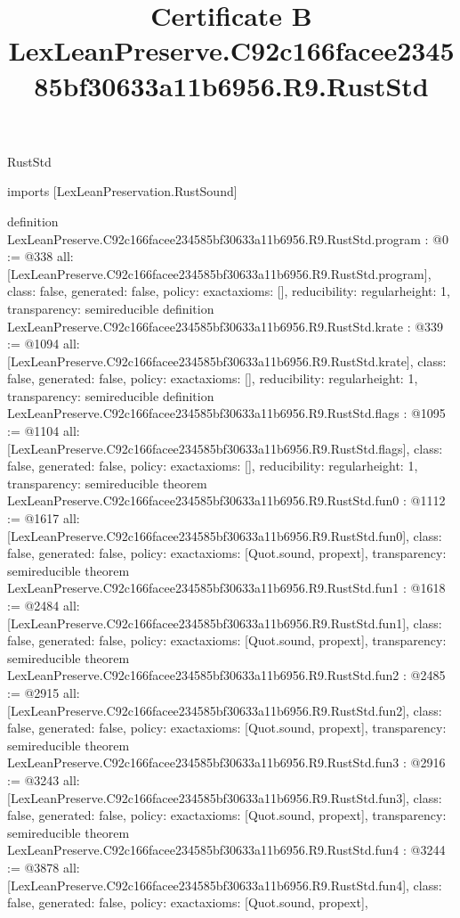 \begin{lexlean}{RustStd}
\title{Certificate B LexLeanPreserve.C92c166facee234585bf30633a11b6956.R9.RustStd}
\begin{coremodule}
imports [LexLeanPreservation.RustSound]

definition LexLeanPreserve.C92c166facee234585bf30633a11b6956.R9.RustStd.program : @0 := @338 {
  all: [LexLeanPreserve.C92c166facee234585bf30633a11b6956.R9.RustStd.program],
  class: false,
  generated: false,
  policy: exact{axioms: []},
  reducibility: regular{height: 1},
  transparency: semireducible
}
definition LexLeanPreserve.C92c166facee234585bf30633a11b6956.R9.RustStd.krate : @339 := @1094 {
  all: [LexLeanPreserve.C92c166facee234585bf30633a11b6956.R9.RustStd.krate],
  class: false,
  generated: false,
  policy: exact{axioms: []},
  reducibility: regular{height: 1},
  transparency: semireducible
}
definition LexLeanPreserve.C92c166facee234585bf30633a11b6956.R9.RustStd.flags : @1095 := @1104 {
  all: [LexLeanPreserve.C92c166facee234585bf30633a11b6956.R9.RustStd.flags],
  class: false,
  generated: false,
  policy: exact{axioms: []},
  reducibility: regular{height: 1},
  transparency: semireducible
}
theorem LexLeanPreserve.C92c166facee234585bf30633a11b6956.R9.RustStd.fun0 : @1112 := @1617 {
  all: [LexLeanPreserve.C92c166facee234585bf30633a11b6956.R9.RustStd.fun0],
  class: false,
  generated: false,
  policy: exact{axioms: [Quot.sound, propext]},
  transparency: semireducible
}
theorem LexLeanPreserve.C92c166facee234585bf30633a11b6956.R9.RustStd.fun1 : @1618 := @2484 {
  all: [LexLeanPreserve.C92c166facee234585bf30633a11b6956.R9.RustStd.fun1],
  class: false,
  generated: false,
  policy: exact{axioms: [Quot.sound, propext]},
  transparency: semireducible
}
theorem LexLeanPreserve.C92c166facee234585bf30633a11b6956.R9.RustStd.fun2 : @2485 := @2915 {
  all: [LexLeanPreserve.C92c166facee234585bf30633a11b6956.R9.RustStd.fun2],
  class: false,
  generated: false,
  policy: exact{axioms: [Quot.sound, propext]},
  transparency: semireducible
}
theorem LexLeanPreserve.C92c166facee234585bf30633a11b6956.R9.RustStd.fun3 : @2916 := @3243 {
  all: [LexLeanPreserve.C92c166facee234585bf30633a11b6956.R9.RustStd.fun3],
  class: false,
  generated: false,
  policy: exact{axioms: [Quot.sound, propext]},
  transparency: semireducible
}
theorem LexLeanPreserve.C92c166facee234585bf30633a11b6956.R9.RustStd.fun4 : @3244 := @3878 {
  all: [LexLeanPreserve.C92c166facee234585bf30633a11b6956.R9.RustStd.fun4],
  class: false,
  generated: false,
  policy: exact{axioms: [Quot.sound, propext]},
}
\end{coremodule}
\end{lexlean}
